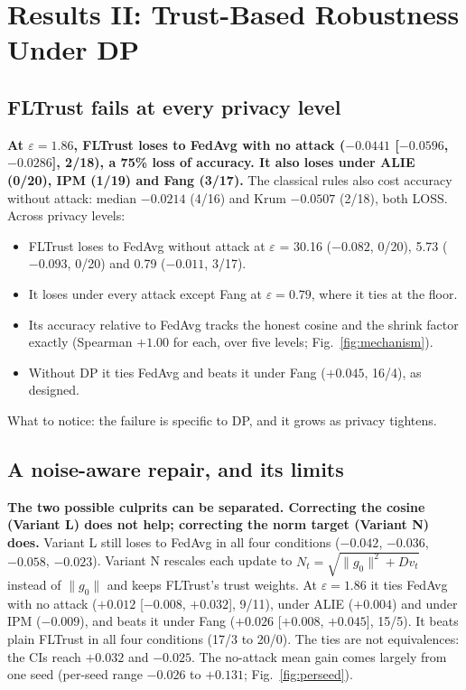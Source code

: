 \documentclass[journal]{IEEEtran}
\newcommand{\eps}{\varepsilon}
\begin{document}
\section{Results II: Trust-Based Robustness Under DP}
\label{sec:res-trust}

\subsection{FLTrust fails at every privacy level}
\textbf{At $\eps = 1.86$, FLTrust loses to FedAvg with no attack ($-0.0441$ [$-0.0596$, $-0.0286$],
2/18), a 75\% loss of accuracy. It also loses under ALIE (0/20), IPM (1/19) and Fang (3/17).} The
classical rules also cost accuracy without attack: median $-0.0214$ (4/16) and Krum $-0.0507$ (2/18),
both LOSS. Across privacy levels:
\begin{itemize}
  \item FLTrust loses to FedAvg without attack at $\eps$ = 30.16 ($-0.082$, 0/20), 5.73 ($-0.093$,
  0/20) and 0.79 ($-0.011$, 3/17).
  \item It loses under every attack except Fang at $\eps = 0.79$, where it ties at the floor.
  \item Its accuracy relative to FedAvg tracks the honest cosine and the shrink factor exactly
  (Spearman $+1.00$ for each, over five levels; Fig.~\ref{fig:mechanism}).
  \item Without DP it ties FedAvg and beats it under Fang ($+0.045$, 16/4), as designed.
\end{itemize}
What to notice: the failure is specific to DP, and it grows as privacy tightens.

\subsection{A noise-aware repair, and its limits}
\textbf{The two possible culprits can be separated. Correcting the cosine (Variant L) does not help;
correcting the norm target (Variant N) does.} Variant L still loses to FedAvg in all four conditions
($-0.042$, $-0.036$, $-0.058$, $-0.023$). Variant N rescales each update to
$N_t = \sqrt{\|g_0\|^2 + Dv_t}$ instead of $\|g_0\|$ and keeps FLTrust's trust weights. At
$\eps = 1.86$ it ties FedAvg with no attack ($+0.012$ [$-0.008$, $+0.032$], 9/11), under ALIE
($+0.004$) and under IPM ($-0.009$), and beats it under Fang ($+0.026$ [$+0.008$, $+0.045$], 15/5).
It beats plain FLTrust in all four conditions (17/3 to 20/0). The ties are not equivalences: the CIs
reach $+0.032$ and $-0.025$. The no-attack mean gain comes largely from one seed (per-seed range
$-0.026$ to $+0.131$; Fig.~\ref{fig:perseed}).
\end{document}

